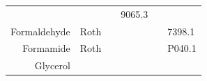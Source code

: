 \documentclass[11pt,singlespacinge,twoside]{reedthesis} %
\begin{document}
\begin{longtable}[]{@{}rccccl@{}}
\begin{minipage}[t]{0.12\columnwidth}
\strut
\end{minipage} & \begin{minipage}[t]{0.12\columnwidth}\centering
\strut
\end{minipage} & \begin{minipage}[t]{0.12\columnwidth}\centering
\strut
\end{minipage} & \begin{minipage}[t]{0.14\columnwidth}\raggedright
9065.3\strut
\end{minipage}\tabularnewline
\begin{minipage}[t]{0.19\columnwidth}\raggedleft
Formaldehyde\strut
\end{minipage} & \begin{minipage}[t]{0.15\columnwidth}\centering
Roth\strut
\end{minipage} & \begin{minipage}[t]{0.12\columnwidth}\centering
\strut
\end{minipage} & \begin{minipage}[t]{0.12\columnwidth}\centering
\strut
\end{minipage} & \begin{minipage}[t]{0.12\columnwidth}\centering
\strut
\end{minipage} & \begin{minipage}[t]{0.14\columnwidth}\raggedright
7398.1\strut
\end{minipage}\tabularnewline
\begin{minipage}[t]{0.19\columnwidth}\raggedleft
Formamide\strut
\end{minipage} & \begin{minipage}[t]{0.15\columnwidth}\centering
Roth\strut
\end{minipage} & \begin{minipage}[t]{0.12\columnwidth}\centering
\strut
\end{minipage} & \begin{minipage}[t]{0.12\columnwidth}\centering
\strut
\end{minipage} & \begin{minipage}[t]{0.12\columnwidth}\centering
\strut
\end{minipage} & \begin{minipage}[t]{0.14\columnwidth}\raggedright
P040.1\strut
\end{minipage}\tabularnewline
\begin{minipage}[t]{0.19\columnwidth}\raggedleft
Glycerol\strut
\end{minipage} & \begin{minipage}[t]{0.15\columnwidth}\centering

\end{minipage}
\end{longtable}
\end{document}
